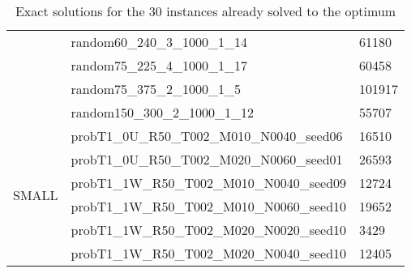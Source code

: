 \begin{table}[]
{\begin{tabular}{@{}lll@{}}
            & random60\_240\_3\_1000\_1\_14              & 61180  \\
            & random75\_225\_4\_1000\_1\_17              & 60458  \\
            & random75\_375\_2\_1000\_1\_5               & 101917 \\
            & random150\_300\_2\_1000\_1\_12             & 55707  \\ \midrule
            \multirow{6}{*}{SMALL} & probT1\_0U\_R50\_T002\_M010\_N0040\_seed06 & 16510  \\
            & probT1\_0U\_R50\_T002\_M020\_N0060\_seed01 & 26593  \\
            & probT1\_1W\_R50\_T002\_M010\_N0040\_seed09 & 12724  \\
            & probT1\_1W\_R50\_T002\_M010\_N0060\_seed10 & 19652  \\
            & probT1\_1W\_R50\_T002\_M020\_N0020\_seed10 & 3429   \\
            & probT1\_1W\_R50\_T002\_M020\_N0040\_seed10 & 12405  \\ \bottomrule
        \end{tabular}
    }
    \caption{Exact solutions for the 30 instances already solved to the optimum}
    \label{tab:exact_opt}
\end{table}
